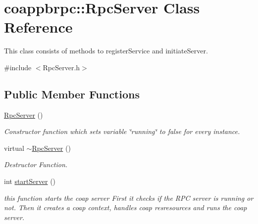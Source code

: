 \hypertarget{classcoappbrpc_1_1RpcServer}{}\section{coappbrpc\+:\+:Rpc\+Server Class Reference}
\label{classcoappbrpc_1_1RpcServer}


This class consists of methods to register\+Service and initiate\+Server.  




{\ttfamily \#include $<$Rpc\+Server.\+h$>$}

\subsection*{Public Member Functions}
\begin{DoxyCompactItemize}
\item 
\mbox{\label{classcoappbrpc_1_1RpcServer_af204829e600b25eebbe1b2f25998bf3a}} 
\hyperlink{classcoappbrpc_1_1RpcServer_af204829e600b25eebbe1b2f25998bf3a}{Rpc\+Server} ()
\begin{DoxyCompactList}\small\item\em Constructor function which sets variable \char`\"{}running\char`\"{} to false for every instance. \end{DoxyCompactList}\item 
\mbox{\label{classcoappbrpc_1_1RpcServer_a6fdde51aa522ed81525990fe2d969380}} 
virtual \hyperlink{classcoappbrpc_1_1RpcServer_a6fdde51aa522ed81525990fe2d969380}{$\sim$\+Rpc\+Server} ()
\begin{DoxyCompactList}\small\item\em Destructor Function. \end{DoxyCompactList}\item 
\mbox{\label{classcoappbrpc_1_1RpcServer_aed271a2a7afc2bdf44d4375cce246f2f}} 
int \hyperlink{classcoappbrpc_1_1RpcServer_aed271a2a7afc2bdf44d4375cce246f2f}{start\+Server} ()
\begin{DoxyCompactList}\small\item\em this function starts the coap server First it checks if the R\+PC server is running or not. Then it creates a coap context, handles coap resresources and runs the coap server. \end{DoxyCompactList}\item 

\end{DoxyCompactItemize}

